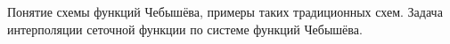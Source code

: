 \documentclass[__main__.tex]{subfiles}
\begin{document}
Понятие схемы функций Чебышёва, примеры таких традиционных схем. Задача интерполяции сеточной функции по системе функций Чебышёва.
\end{document}
